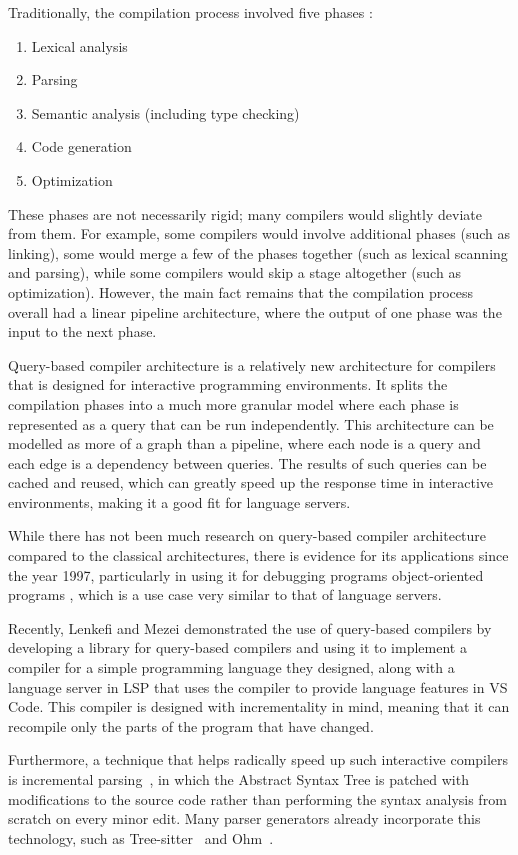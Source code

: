 Traditionally, the compilation process involved five phases \cite{dragon-book}:
\begin{enumerate}
  \item Lexical analysis
  \item Parsing
  \item Semantic analysis (including type checking)
  \item Code generation
  \item Optimization
\end{enumerate}

These phases are not necessarily rigid; many compilers would slightly deviate from them.
For example, some compilers would involve additional phases (such as linking),
some would merge a few of the phases together (such as lexical scanning and parsing),
while some compilers would skip a stage altogether (such as optimization).
However, the main fact remains that the compilation process overall had a linear pipeline
architecture, where the output of one phase was the input to the next phase.

Query-based compiler architecture \cite{ollef-rock} is a relatively new architecture for
compilers that is designed for interactive programming environments.
It splits the compilation phases into a much more granular model where each phase is
represented as a query that can be run independently.
This architecture can be modelled as more of a graph than a pipeline, where each node
is a query and each edge is a dependency between queries.
The results of such queries can be cached and reused, which can greatly speed up the
response time in interactive environments, making it a good fit for language servers.

While there has not been much research on query-based compiler architecture compared
to the classical architectures, there is evidence for its applications since the year 1997,
particularly in using it for debugging programs object-oriented programs \cite{Lencevicius1997},
which is a use case very similar to that of language servers.

Recently, Lenkefi and Mezei \cite{icsoft22} demonstrated the use of query-based compilers
by developing a library for query-based compilers and using it to implement a compiler
for a simple programming language they designed, along with a language server in LSP
that uses the compiler to provide language features in VS Code.
This compiler is designed with incrementality in mind, meaning that it can recompile
only the parts of the program that have changed.

Furthermore, a technique that helps radically speed up such interactive compilers
is incremental parsing~\cite{Ghezzi1979, diekmann2019editing, Wagner1998},
in which the Abstract Syntax Tree is patched with modifications to the source code
rather than performing the syntax analysis from scratch on every minor edit.
Many parser generators already incorporate this technology, such as
Tree-sitter~\cite{tree-sitter} and Ohm~\cite{Dubroy2017}.
